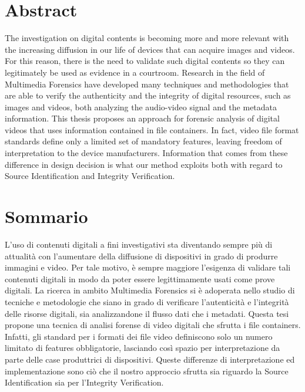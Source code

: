 \chapter*{Abstract}

The investigation on digital contents is becoming more and more relevant with the increasing diffusion in our life of devices that can acquire images and videos. For this reason, there is the need to validate such digital contents so they can legitimately be used as evidence in a courtroom.
Research in the field of Multimedia Forensics have developed many techniques and methodologies that are able to verify the authenticity and the integrity of digital resources, such as images and videos, both analyzing the audio-video signal and the metadata information.
This thesis proposes an approach for forensic analysis of digital videos that uses information contained in file containers. In fact, video file format standards define only a limited set of mandatory features, leaving freedom of interpretation to the device manufacturers.
Information that comes from these difference in design decision is what our method exploits both with regard to Source Identification and Integrity Verification.

\chapter*{Sommario}

L'uso di contenuti digitali a fini investigativi sta diventando sempre più di attualità con l'aumentare della diffusione di dispositivi in grado di produrre immagini e video. Per tale motivo, è sempre maggiore l'esigenza di validare tali contenuti digitali in modo da poter essere legittimamente usati come prove digitali.
La ricerca in ambito Multimedia Forensics si è adoperata nello studio di tecniche e metodologie che siano in grado di verificare l'autenticità e l'integrità delle risorse digitali, sia analizzandone il flusso dati che i metadati. 
Questa tesi propone una tecnica di analisi forense di video digitali che sfrutta i file containers. Infatti, gli standard per i formati dei file video definiscono solo un numero limitato di features obbligatorie, lasciando così spazio per interpretazione da parte delle case produttrici di dispositivi. Queste differenze di interpretazione ed implementazione sono ciò che il nostro approccio sfrutta sia riguardo la Source Identification sia per l'Integrity Verification.